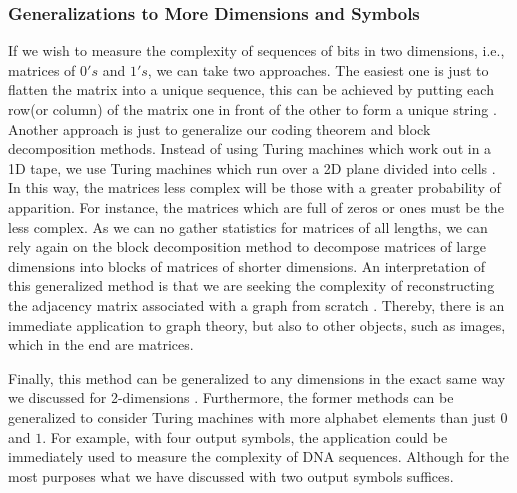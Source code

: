 \subsubsection{Generalizations to More Dimensions and Symbols}
If we wish to measure the complexity of sequences of bits in two dimensions, i.e., matrices of $0's$ and $1's$, we can take two approaches. The easiest one is just to flatten the matrix into a unique sequence, this can be achieved by putting each row(or column) of the matrix one in front of the other to form a unique string \cite{kolmo_graph}. 
Another approach is just to generalize our coding theorem and block decomposition methods. Instead of using Turing machines which work out in a 1D tape, we use Turing machines which run over a 2D plane divided into cells \cite{universos}. In this way, the matrices less complex will be those with a greater probability of apparition. For instance, the matrices which are full of zeros or ones must be the less complex. As we can no gather statistics for matrices of all lengths, we can rely again on the block decomposition method to decompose matrices of large dimensions into blocks of matrices of shorter dimensions. An interpretation of this generalized method is that we are seeking the complexity of reconstructing the adjacency matrix associated with a graph from scratch \cite{decomposition}. Thereby, there is an immediate application to graph theory, but also to other objects, such as images, which in the end are matrices. 

Finally, this method can be generalized to any dimensions in the exact same way we discussed for 2-dimensions \cite{decomposition}. Furthermore, the former methods can be generalized to consider Turing machines with more alphabet elements than just $0$ and $1$. For example, with four output symbols, the application could be immediately used to measure the complexity of DNA sequences. Although for the most purposes what we have discussed with two output symbols suffices.


